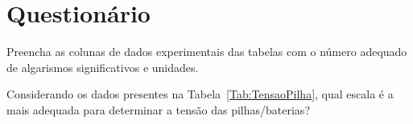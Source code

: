\cleardoublepage


\vspace{15mm}

\begin{fullwidth}
\noindent{}
\vspace{5mm}

\noindent{}

\noindent{}

\noindent{}

\noindent{}

\noindent{}
\end{fullwidth}

\vspace{5mm}

\section{Questionário}

\begin{question}[type={exam}]
Preencha as colunas de dados experimentais das tabelas com o número adequado de algarismos significativos e unidades.
\end{question}

\begin{question}[type={exam}]
Considerando os dados presentes na Tabela~\ref{Tab:TensaoPilha}, qual escala é a mais adequada para determinar a tensão das pilhas/baterias?
\end{question}

